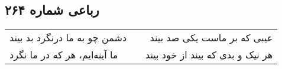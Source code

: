 \begin{center}
\section*{رباعی شماره ۲۶۴}
\label{sec:sh264}
\begin{longtable}{l p{0.5cm} r}
دشمن چو به ما درنگرد بد بیند
&&
عیبی که بر ماست یکی صد بیند
\\
ما آینه‌ایم، هر که در ما نگرد
&&
هر نیک و بدی که بیند از خود بیند
\\
\end{longtable}
\end{center}

